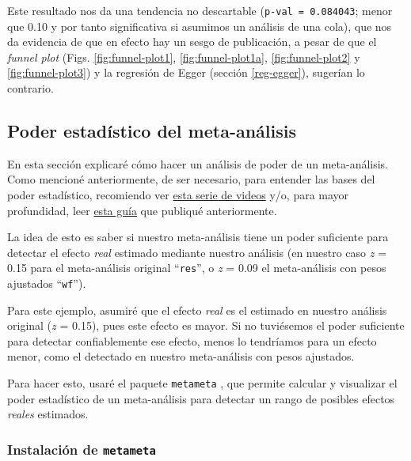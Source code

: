 \documentclass[
  bookmarksnumbered]{article}
\begin{document}
Este resultado nos da una tendencia no descartable (\texttt{p-val\ =\ 0.084043}; menor que 0.10 y por tanto significativa si asumimos un análisis de una cola), que nos da evidencia de que en efecto hay un sesgo de publicación, a pesar de que el \emph{funnel plot} (Figs. \ref{fig:funnel-plot1}, \ref{fig:funnel-plot1a}, \ref{fig:funnel-plot2} y \ref{fig:funnel-plot3}) y la regresión de Egger (sección \ref{reg-egger}), sugerían lo contrario.

\hypertarget{poder-inf}{%
\subsection{Poder estadístico del meta-análisis}\label{poder-inf}}

En esta sección explicaré cómo hacer un análisis de poder de un meta-análisis.
Como mencioné anteriormente, de ser necesario, para entender las bases del poder estadístico, recomiendo ver \href{https://youtube.com/playlist?list\%20=\%20PLHk7UNt35ccVdyHqnQ6oXVYA6JBNFrE1x}{esta serie de videos} \autocite{leongomezPoderRvid2020} y/o, para mayor profundidad, leer \href{https://doi.org/10.5281/zenodo.3988776}{esta guía} \autocite{leongomezAnalisisPoderEstadistico2020} que publiqué anteriormente.

La idea de esto es saber si nuestro meta-análisis tiene un poder suficiente para detectar el efecto \emph{real} estimado mediante nuestro análisis (en nuestro caso \emph{z} = 0.15 para el meta-análisis original ``\texttt{res}'', o \emph{z} = 0.09 el meta-análisis con pesos ajustados ``\texttt{wf}'').

Para este ejemplo, asumiré que el efecto \emph{real} es el estimado en nuestro análisis original (\emph{z} = 0.15), pues este efecto es mayor. Si no tuviésemos el poder suficiente para detectar confiablemente ese efecto, menos lo tendríamos para un efecto menor, como el detectado en nuestro meta-análisis con pesos ajustados.

Para hacer esto, usaré el paquete \texttt{metameta} \autocite{quintanaGuideMetaPower,quintanaMetameta2022}, que permite calcular y visualizar el poder estadístico de un meta-análisis para detectar un rango de posibles efectos \emph{reales} estimados.

\hypertarget{instalaciuxf3n-de-metameta}{%
\subsubsection{\texorpdfstring{Instalación de \texttt{metameta}}{Instalación de metameta}}\label{instalaciuxf3n-de-metameta}}
\end{document}
